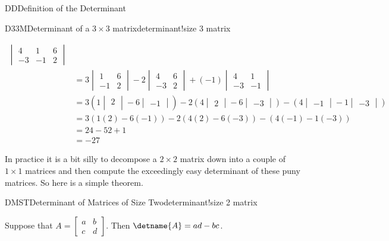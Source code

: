 \begin{subsect}{DD}{Definition of the Determinant}
\begin{example}{D33M}{Determinant of a $3\times 3$ matrix}{determinant!size 3 matrix}
\begin{para}
\begin{align*}
\begin{vmatrix}
4 & 1 & 6\\
-3 & -1 & 2
\end{vmatrix}\\
&=
3
\begin{vmatrix}
1 & 6\\
-1 & 2
\end{vmatrix}
-2
\begin{vmatrix}
4 & 6\\
-3 & 2
\end{vmatrix}
+(-1)
\begin{vmatrix}
4 & 1\\
-3 & -1
\end{vmatrix}\\
&=
3\left(
1\begin{vmatrix}
2\\
\end{vmatrix}
-6\begin{vmatrix}
-1
\end{vmatrix}\right)
-2\left(
4\begin{vmatrix}
2
\end{vmatrix}
-6\begin{vmatrix}
-3
\end{vmatrix}\right)
-\left(
4\begin{vmatrix}
-1
\end{vmatrix}
-1\begin{vmatrix}
-3
\end{vmatrix}\right)\\
&=
3\left(1(2)-6(-1)\right)
-2\left(4(2)-6(-3)\right)
-\left(4(-1)-1(-3)\right)\\
&=24-52+1\\
&=-27
\end{align*}
\end{para}
%
\end{example}
%
\begin{para}In practice it is a bit silly to decompose a $2\times 2$ matrix down into a couple of $1\times 1$ matrices and then compute the exceedingly easy determinant of these puny matrices.  So here is a simple theorem.\end{para}
%
\begin{theorem}{DMST}{Determinant of Matrices of Size Two}{determinant!size 2 matrix}
\begin{para}Suppose that
$A=\begin{bmatrix}a&b\\c&d\end{bmatrix}$.
Then $\detname{A}=ad-bc$.\end{para}

\end{theorem}
\end{subsect}
